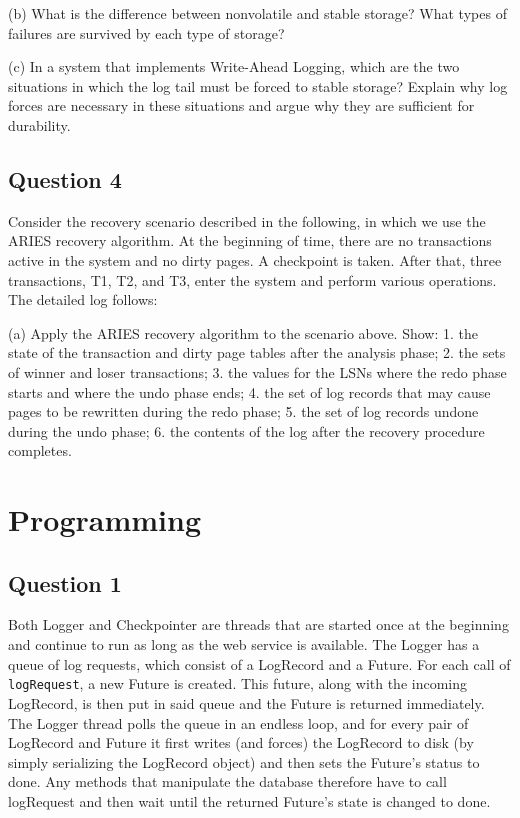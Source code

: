 \documentclass[12pt,a4paper]{article}
\begin{document}
(b) What is the difference between nonvolatile and stable storage? What types of failures are
survived by each type of storage?

(c) In a system that implements Write-Ahead Logging, which are the two situations in which the log
tail must be forced to stable storage? Explain why log forces are necessary in these situations and
argue why they are sufficient for durability.


\subsection*{Question 4}
\label{sec:eq4}

Consider the recovery scenario described in the following, in which we use the
ARIES recovery algorithm. At the beginning of time, there are no transactions active in the system and no
dirty pages. A checkpoint is taken. After that, three transactions, T1, T2, and T3, enter the system and
perform various operations. The detailed log follows:

(a) Apply the ARIES recovery algorithm to the scenario above. Show:
1. the state of the transaction and dirty page tables after the analysis phase;
2. the sets of winner and loser transactions;
3. the values for the LSNs where the redo phase starts and where the undo phase ends;
4. the set of log records that may cause pages to be rewritten during the redo phase;
5. the set of log records undone during the undo phase;
6. the contents of the log after the recovery procedure completes.


\section*{Programming} 
\label{sec:programming}

\subsection*{Question 1}
\label{sec:pq1}

Both Logger and Checkpointer are threads that are started once at the beginning and continue to run as long as the web service is available. The Logger has a queue of log requests, which consist of a LogRecord and a Future. For each call of \texttt{logRequest}, a new Future is created. This future, along with the incoming LogRecord, is then put in said queue and the Future is returned immediately. The Logger thread polls the queue in an endless loop, and for every pair of LogRecord and Future it first writes (and forces) the LogRecord to disk (by simply serializing the LogRecord object) and then sets the Future's status to done. Any methods that manipulate the database therefore have to call logRequest and then wait until the returned Future's state is changed to done.
\end{document}

